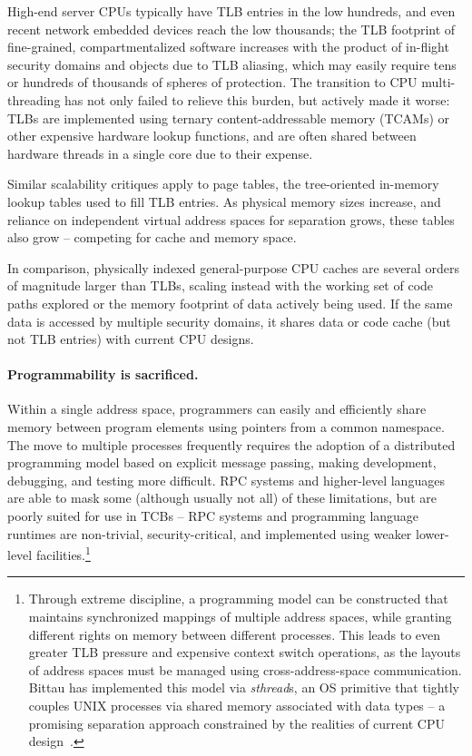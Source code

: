 High-end server CPUs typically have TLB entries in the low hundreds, and
even recent network embedded devices reach
the low thousands; the TLB
footprint of fine-grained, compartmentalized software increases with the product of
in-flight security domains and objects due to TLB aliasing, which may easily require
tens or hundreds of thousands of spheres of protection.
The transition to CPU multi-threading has not only failed to relieve this burden,
but actively made it worse: TLBs are implemented using ternary content-addressable
memory (TCAMs) or
other expensive hardware lookup functions, and are often shared between hardware
threads in a single core due to their expense.

Similar scalability critiques apply to page tables, the tree-oriented
in-memory lookup tables used to fill TLB entries.
As physical memory sizes increase, and reliance on independent virtual address
spaces for separation grows, these tables also grow -- competing for cache
and memory space.

In comparison, physically indexed general-purpose CPU caches are several orders
of magnitude larger than TLBs, scaling instead with the working set of code paths
explored or the memory footprint of data actively being used.
If the same data is accessed by multiple security domains, it shares data or code
cache (but not TLB entries) with current CPU designs.

\paragraph{Programmability is sacrificed.}
Within a single address space, programmers
can easily and efficiently share memory between program elements using pointers
from a common namespace.
The move to multiple processes frequently requires the adoption of a distributed
programming model based on explicit message passing, making development,
debugging, and testing more difficult.
RPC systems and higher-level languages are able to mask some (although usually
not all) of these limitations, but are poorly suited for use in TCBs -- RPC systems and
programming language
runtimes are non-trivial, security-critical, and implemented using weaker
lower-level facilities.\footnote{Through extreme
discipline, a programming model can be constructed that maintains synchronized
mappings of multiple address spaces, while granting different rights on memory
between different processes.  This leads to even greater TLB pressure
and expensive context switch operations, as
the layouts of address spaces must be managed using cross-address-space
communication.
Bittau has implemented this model via {\em sthread}s, an OS primitive that
tightly couples UNIX processes via shared memory associated with data types
-- a promising separation approach constrained by the realities of current
CPU design~\cite{bittau:wedge}.}

